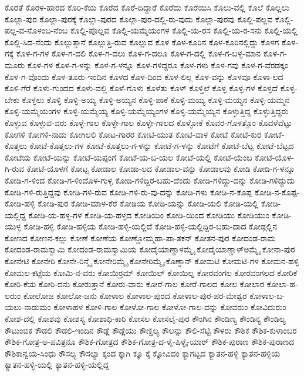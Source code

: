 ಕೊರತೆ
ಕೊರಳ-ಹಾರದ
ಕೊರಿ-ಕೆಯ
ಕೊರೆದ
ಕೊರೆ-ದಿದ್ದಾರೆ
ಕೊರೆದು
ಕೊರೆಯಿಸಿ
ಕೊಲು-ವಲ್ಲಿ
ಕೊಲೆ
ಕೊಲ್ಲಲು
ಕೊಲ್ಲಾ-ಪುರ
ಕೊಲ್ಲಾ-ಪುರಕ್ಕೆ
ಕೊಲ್ಲಾ-ಪುರದ
ಕೊಲ್ಲಾ-ಪುರ-ದಲ್ಲಿ-ರು-ವುದು
ಕೊಲ್ಲಾ-ಪುರವು
ಕೊಲ್ಲಿ-ಪಲ್ಲವ
ಕೊಲ್ಲಿ-ಪಲ್ಲ-ವ-ನೊಳಂಬ-ನೆಂಬ
ಕೊಲ್ಲಿ-ಪೊಲ್ಲವ
ಕೊಲ್ಲಿ-ಯಮ್ಮೆಯಂಗಳ
ಕೊಲ್ಲಿ-ಯ-ರಸ
ಕೊಲ್ಲಿ-ಯ-ರ-ಸನು
ಕೊಲ್ಲಿ-ಯಲ್ಲಿ
ಕೊಲ್ಲಿ-ಸಿದ-ನೆಂದು
ಕೊಲ್ಲುತ್ತಾನೆ
ಕೊಲ್ಲುತ್ತಿ-ರುವ
ಕೊಲ್ಲುವ
ಕೊಳ
ಕೊಳ-ಕೂರಿನ
ಕೊಳ-ಕೂರಿನಲ್ಲಿದ್ದು
ಕೊಳಗ
ಕೊಳ-ಗಕ್ಕೆ
ಕೊಳ-ಗ-ಗಳ
ಕೊಳ-ಗ-ದಲಿ
ಕೊಳ-ಗ-ದಲು
ಕೊಳ-ಗ-ದಲೂ
ಕೊಳ-ಗ-ದಲ್ಲಿ
ಕೊಳ-ಗ-ಬಳ್ಳ-ಮಾನ
ಕೊಳ-ಗ-ಮೂರು
ಕೊಳ-ಗಳ
ಕೊಳ-ಗ-ಳನ್ನು
ಕೊಳ-ಗ-ಳನ್ನೂ
ಕೊಳ-ಗಳಿದ್ದರೂ
ಕೊಳ-ಗಳು
ಕೊಳ-ಗವು
ಕೊಳ-ಗ-ವೆರಡಕ್ಕಂ
ಕೊಳ-ಗ-ವೊಂದು
ಕೊಳ-ತೂರು-ಇಂದಿನ
ಕೊಳದ
ಕೊಳ-ದಿಂದ
ಕೊಳ-ಲಿಲ್ಲ
ಕೊಳ-ವನ್ನು
ಕೊಳವೂ
ಕೊಳಾ-ಲದ
ಕೊಳಿ-ಗೆರೆ
ಕೊಳು-ಗುಂದದ
ಕೊಳು-ವಲ್ಲಿ
ಕೊಳೆ-ಗೊಳು
ಕೊಳೆತು
ಕೊಳ್
ಕೊಳ್ತಿಲೆ
ಕೊಳ್ಳ
ಕೊಳ್ಳ-ಗಳ
ಕೊಳ್ಳದೆ
ಕೊಳ್ಳ-ಬೇಕು
ಕೊಳ್ಳಲು
ಕೊಳ್ಳಿ
ಕೊಳ್ಳಿ-ಅಯ್ಯ
ಕೊಳ್ಳಿ-ಅಯ್ಯನ
ಕೊಳ್ಳಿ-ಪಾಕೆ
ಕೊಳ್ಳಿ-ಮಯ್ಯ
ಕೊಳ್ಳಿ-ಮಯ್ಯನ
ಕೊಳ್ಳಿ-ಯಮ್ಮನ
ಕೊಳ್ಳಿ-ಯಮ್ಮೆಯಂಗಳ
ಕೊಳ್ಳಿ-ಯಮ್ಮೆಯ್ಯ
ಕೊಳ್ಳಿ-ಯಮ್ಮೆಯ್ಯಂಗಳ
ಕೊಳ್ಳಿ-ಯಮ್ಮೆಯ್ಯನ
ಕೊಳ್ಳುತ್ತಿದ್ದ
ಕೊಳ್ಳುತ್ತಿದ್ದರು
ಕೊಳ್ಳುವ
ಕೊಳ್ಳುವ-ವರು
ಕೊಳ್ಳೆ-ಗಾಲ
ಕೊಳ್ಳೇ-ಗಾಲ
ಕೊಳ್ಳೇ-ಗಾಲದ
ಕೊಳ್ಳೋಕೆ
ಕೊವರ-ಗೊಳತ್ತೊಂ
ಕೊವಳೆವೆಟ್ಟು
ಕೋಗಳಿ
ಕೋಗಳಿ-ನಾಡು
ಕೋಗಿಲಲಿ
ಕೋಟ-ಗಾರರ
ಕೋಟಿ-ಯುತ
ಕೋಟಿ-ವಾಳ
ಕೋಟೆ
ಕೋಟೆ-ಕುರ
ಕೋಟೆ-ಕೊತ್ತಲು
ಕೋಟೆ-ಕೊತ್ತಲು-ಗಳ
ಕೋಟೆ-ಕೊತ್ತಲು-ಗ-ಳನ್ನು
ಕೋಟೆ-ಗ-ಳನ್ನು
ಕೋಟೆಗೆ
ಕೋಟೆ-ಬೆಟ್ಟ
ಕೋಟೆ-ಬೆಟ್ಟದ
ಕೋಟೆಯ
ಕೋಟೆ-ಯನ್ನು
ಕೋಟೆ-ಯಪ್ಪಂಗೆ
ಕೋಟೆ-ಯ-ಬ-ಯಲ
ಕೋಟೆ-ಯಲ್ಲಿ
ಕೋಟೆ-ಯೆಂಬ
ಕೋಟೆ-ಯೊಳ-ಗಿ-ರುವ
ಕೋಟೆ-ಯೊಳಗೆ
ಕೋಟ್ಟ
ಕೋಡಾಲ
ಕೋಡಾ-ಲದ
ಕೋಡಾಲ-ವನ್ನು
ಕೋಡಾಲವು
ಕೋಡಿ
ಕೋಡಿ-ಗ-ಳನ್ನೂ
ಕೋಡಿ-ಗ-ಳಿಂದ
ಕೋಡಿ-ಗ-ಳಿಂದೊಳ-ಗುಳ್ಳ
ಕೋಡಿ-ಗಳಿದ್ದಿರ-ಬಹು-ದೆಂದು
ಕೋಡಿ-ಗಳಿದ್ದು-ದನ್ನು
ಕೋಡಿ-ಗಳಿದ್ದುದು
ಕೋಡಿ-ಗಳಿ-ರುತ್ತಿದ್ದವು
ಕೋಡಿ-ಗಳಿ-ರುವ
ಕೋಡಿ-ಗಳಿ-ರು-ವು-ದನ್ನು
ಕೋಡಿ-ಗಳು
ಕೋಡಿ-ನ-ಕೊಪ್ಪ
ಕೋಡಿ-ನ-ಕೊಪ್ಪ-ಕೋಡಿ-ಹಳ್ಳಿ
ಕೋಡಿ-ಪುರ
ಕೋಡಿ-ಮಾಳ-ಕೆರೆ
ಕೋಡಿಯ
ಕೋಡಿ-ಯನ್ನು
ಕೋಡಿ-ಯಲಿ
ಕೋಡಿ-ಯಲ್ಲಿ
ಕೋಡಿ-ಯಲ್ಲಿದ್ದ
ಕೋಡಿ-ಯ-ಹಳ್ಳ-ಗಳ
ಕೋಡಿ-ಯ-ಹಳ್ಳದ
ಕೋಡಿಯಿಂ
ಕೋಡಿ-ಯಿಂದ
ಕೋಡಿಯು
ಕೋಡಿಯುಂ
ಕೋಡಿ-ಯುಳ್ಳ
ಕೋಡಿ-ಹಳ್ಳಿ
ಕೋಡಿ-ಹಳ್ಳಿಯ
ಕೋಡಿ-ಹಳ್ಳಿ-ಯಲ್ಲಿದೆ
ಕೋಡಿ-ಹಳ್ಳಿ-ಯಲ್ಲಿದ್ದಿರ-ಬಹು-ದಾದ
ಕೋಡ್ಗಲ್ಲಿನ
ಕೋಣದ
ಕೋಣನ-ಕಲ್ಲು
ಕೋಣೆ
ಕೋಣೆಯ
ಕೋಣ್ಡೋಮ್ಮಹಾ-ಪಾ-ತಕನ್
ಕೋತನ-ಪುರ
ಕೋದಂಡ-ರಾಮ
ಕೋದಂಡ-ರಾಮಸ್ವಾಮಿ
ಕೋದಂಡ-ರಾಮಸ್ವಾಮಿಯ
ಕೋದೈಯಾಣ್ಡಾಳಮ್ಮೈ
ಕೋದೈಯಾಣ್ಡಾಳ್ಅಮ್ಮೈ
ಕೋನಾ-ಪುರ
ಕೋನೇಟಿ
ಕೋನೇರಿ
ಕೋನೇ-ರಿನ್ಮೈ
ಕೋನೇರಿಮ್ಮೈ
ಕೋನೇರಿಮ್ಮೈ-ಕೊಣ್ಡಾನ್
ಕೋಮಟಿ
ಕೋಮಟಿ-ಗಳ
ಕೋಮನ-ಹಳ್ಳಿ
ಕೋಮಲ-ಕಟ್ಟೆಯ
ಕೋಮಿ-ನ-ವರು
ಕೋಯಿರ್ರಮ್
ಕೋಯಿಲ್
ಕೋಯಿಲ್ನ
ಕೋರವಂಗಲ
ಕೋರವಂಗಲದ
ಕೋರಿಕೆ
ಕೋರಿ-ಕೆಯ
ಕೋರಿ-ದನು
ಕೋರುತ್ತಾನೆ
ಕೋರು-ವಾರು
ಕೋರೆ-ಗಾಲ
ಕೋರೆ-ಗಾಲದ
ಕೋಲ
ಕೋಲಾರ
ಕೋಲಾ-ಹ-ಲರುಂ
ಕೋಲೋಜ
ಕೋಲೋ-ಜನು
ಕೋಳಾಲ
ಕೋಳಾಲ-ಪುರದ
ಕೋಳಾಲ-ಪುರ-ಪರ-ಮೇಶ್ವರ
ಕೋಳಾಲ-ಬ-ಯಲು-ನಾಡುಮಂ
ಕೋಳಾಹಳ
ಕೋಳಿ-ಗಾಲ
ಕೋಳೋ-ಗಾಲ
ಕೋಳೋ-ಗಾಲ-ವನ್ನು
ಕೋವರುಂ
ಕೋವಿದುರುಂ
ಕೋಶ-ದಲ್ಲಿ
ಕೋಶವು
ಕೋಶಸ್ಯ
ಕೋಶಾಧಿ-ಕಾರಿ
ಕೋಸಲ
ಕೋಸಲೈ-ಪುರ
ಕೌಂಗಿನ
ಕೌಂಡಿಣ್ಯ
ಕೌಂಡಿನ್ಯ
ಕೌಂಡಿಲ್ಯ
ಕೌಟುಂಬಿಕ
ಕೌಡಲಿ
ಕೌಡಲಿ-ಇಂದಿನ
ಕೌಡ್ಲೆ
ಕೌಡ್ಲೆಯು
ಕೌಣ್ಡಿಲ್ಯ
ಕೌಲನ್ನು
ಕೌಲಿ-ಸೆಟ್ಟಿ
ಕೌಳರು
ಕೌಶಿಕ
ಕೌಶಿಕ-ಕುಳಾಂಬರ
ಕೌಶಿಕ-ಗೋತ್ರ-ಅ-ಪವಿತ್ರನೂ
ಕೌಶಿಕ-ಗೋತ್ರದ
ಕೌಶಿಕ-ಗೋತ್ರ-ದ-ಳೈ-ಪಿಳ್ಳೈ-ಯಾರ್
ಕೌಶಿಕ-ಪುರಾಣ
ಕೌಶಿಕ-ಪುರಾಣದ
ಕೌಶಿಕಾನ್ವಯ-ಸಿಂಧು
ಕೌಸಲ್ಯ
ಕೌಸಲ್ಯಾ
ಕ್ಕಂದ
ಕ್ಕಾಗಿ
ಕ್ಕೂ
ಕ್ಕೆ
ಕ್ಕೋವಿದಂ
ಕ್ಯಾಗಟ್ಟದ
ಕ್ಯಾತನ-ಹಳ್ಳಿ
ಕ್ಯಾತನ-ಹಳ್ಳಿಯ
ಕ್ಯಾತನ-ಹಳ್ಳಿ-ಯಲ್ಲಿ
ಕ್ಯಾತನ-ಹಳ್ಳಿ-ಯಲ್ಲಿದ್ದ
